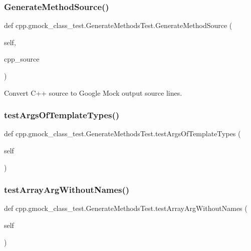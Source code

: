 \subsubsection{\texorpdfstring{GenerateMethodSource()}{GenerateMethodSource()}}
{\footnotesize\ttfamily def cpp.\+gmock\+\_\+class\+\_\+test.\+Generate\+Methods\+Test.\+Generate\+Method\+Source (\begin{DoxyParamCaption}\item[{}]{self,  }\item[{}]{cpp\+\_\+source }\end{DoxyParamCaption})}

\begin{DoxyVerb}Convert C++ source to Google Mock output source lines.\end{DoxyVerb}
 \mbox{\label{classcpp_1_1gmock__class__test_1_1_generate_methods_test_ade05313ccffe74f9eaa42fb66c14f702}} 
\subsubsection{\texorpdfstring{testArgsOfTemplateTypes()}{testArgsOfTemplateTypes()}}
{\footnotesize\ttfamily def cpp.\+gmock\+\_\+class\+\_\+test.\+Generate\+Methods\+Test.\+test\+Args\+Of\+Template\+Types (\begin{DoxyParamCaption}\item[{}]{self }\end{DoxyParamCaption})}

\mbox{\label{classcpp_1_1gmock__class__test_1_1_generate_methods_test_a544cd40e30b5dc3fbcf42385f0a54ad1}} 
\subsubsection{\texorpdfstring{testArrayArgWithoutNames()}{testArrayArgWithoutNames()}}
{\footnotesize\ttfamily def cpp.\+gmock\+\_\+class\+\_\+test.\+Generate\+Methods\+Test.\+test\+Array\+Arg\+Without\+Names (\begin{DoxyParamCaption}\item[{}]{self }\end{DoxyParamCaption})}

